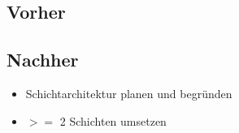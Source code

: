 \subsection{Vorher}
\subsection{Nachher}
\begin{itemize}
	\item Schichtarchitektur planen und begründen
	\item $>=$ 2 Schichten umsetzen
\end{itemize}
